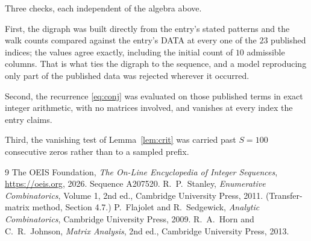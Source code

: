 \documentclass[11pt,a4paper]{article}
\theoremstyle{plain}
\theoremstyle{definition}
\begin{document}
Three checks, each independent of the algebra above.

First, the digraph was built directly from the entry's stated patterns and the walk counts
compared against the entry's DATA at every one of the $23$ published indices; the
values agree exactly, including the initial count of $10$ admissible columns. That is
what ties the digraph to the sequence, and a model reproducing only part of the published
data was rejected wherever it occurred.

Second, the recurrence \eqref{eq:conj} was evaluated on those published terms in exact
integer arithmetic, with no matrices involved, and vanishes at every index the entry claims.

Third, the vanishing test of Lemma~\ref{lem:crit} was carried past $S=100$ consecutive
zeros rather than to a sampled prefix.

\begin{thebibliography}{9}
 The OEIS Foundation, \emph{The On-Line Encyclopedia of Integer
Sequences}, \url{https://oeis.org}, 2026. Sequence A207520.
 R.~P.~Stanley, \emph{Enumerative Combinatorics}, Volume 1, 2nd ed.,
Cambridge University Press, 2011. (Transfer-matrix method, Section 4.7.)
 P.~Flajolet and R.~Sedgewick, \emph{Analytic Combinatorics}, Cambridge
University Press, 2009.
 R.~A.~Horn and C.~R.~Johnson, \emph{Matrix Analysis}, 2nd ed., Cambridge
University Press, 2013.
\end{thebibliography}
\end{document}
